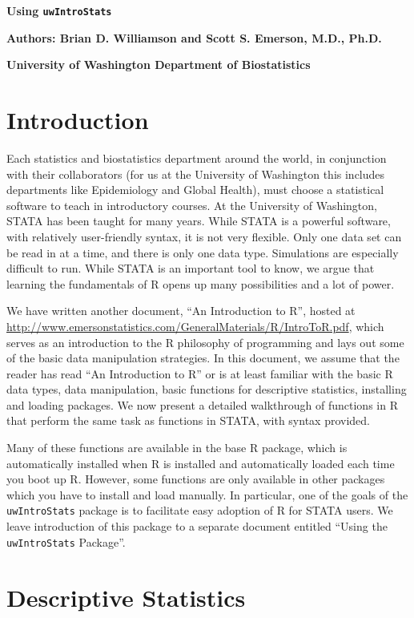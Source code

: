 \documentclass[landscape]{article}
\begin{document}

\centerline{\large{\textbf{Using \texttt{uwIntroStats}}}}
\centerline{\textbf{Authors: Brian D. Williamson and Scott S. Emerson, M.D., Ph.D.}}
\centerline{\textbf{University of Washington Department of Biostatistics}}
\tableofcontents
\newpage

\section{Introduction}
Each statistics and biostatistics department around the world, in conjunction with their collaborators (for us at the University of Washington this includes departments like Epidemiology and Global Health), must choose a statistical software to teach in introductory courses. At the University of Washington, STATA has been taught for many years. While STATA is a powerful software, with relatively user-friendly syntax, it is not very flexible. Only one data set can be read in at a time, and there is only one data type. Simulations are especially difficult to run. While STATA is an important tool to know, we argue that learning the fundamentals of R opens up many possibilities and a lot of power. 

We have written another document, ``An Introduction to R'', hosted at \url{http://www.emersonstatistics.com/GeneralMaterials/R/IntroToR.pdf}, which serves as an introduction to the R philosophy of programming and lays out some of the basic data manipulation strategies. In this document, we assume that the reader has read ``An Introduction to R'' or is at least familiar with the basic R data types, data manipulation, basic functions for descriptive statistics, installing and loading packages. We now present a detailed walkthrough of functions in R that perform the same task as functions in STATA, with syntax provided. 

Many of these functions are available in the base R package, which is automatically installed when R is installed and automatically loaded each time you boot up R. However, some functions are only available in other packages which you have to install and load manually. In particular, one of the goals of the \texttt{uwIntroStats} package is to facilitate easy adoption of R for STATA users. We leave introduction of this package to a separate document entitled ``Using the \texttt{uwIntroStats} Package''.

\section{Descriptive Statistics}
\end{document}
